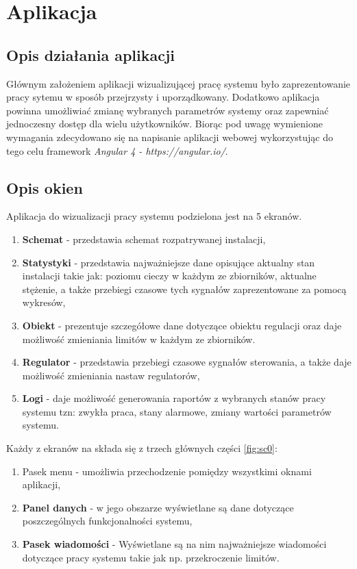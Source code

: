 \chapter{Aplikacja}
\section{Opis działania aplikacji}
Głównym założeniem aplikacji wizualizującej pracę systemu było zaprezentowanie pracy sytemu w sposób przejrzysty i uporządkowany. Dodatkowo aplikacja powinna umożliwiać zmianę wybranych parametrów systemy oraz zapewniać jednoczesny dostęp dla wielu użytkowników. Biorąc pod uwagę wymienione wymagania zdecydowano się na napisanie aplikacji webowej wykorzystując do tego celu framework \textit{Angular 4 - https://angular.io/}.
\section{Opis okien}
Aplikacja do wizualizacji pracy systemu podzielona jest na 5 ekranów. 
\begin{enumerate}
	\item \textbf{Schemat} - przedstawia schemat rozpatrywanej instalacji,
	\item \textbf{Statystyki} - przedstawia najważniejsze dane opisujące aktualny stan instalacji takie jak: poziomu cieczy w każdym ze zbiorników, aktualne stężenie, a także przebiegi czasowe tych sygnałów zaprezentowane za pomocą wykresów,
	\item \textbf{Obiekt} - prezentuje szczegółowe dane dotyczące obiektu regulacji oraz daje możliwość zmieniania limitów w każdym ze zbiorników.
	\item \textbf{Regulator} - przedstawia przebiegi czasowe sygnałów sterowania, a także daje możliwość zmieniania nastaw regulatorów,
	\item \textbf{Logi} - daje możliwość generowania raportów z wybranych stanów pracy systemu tzn: zwykła praca, stany alarmowe, zmiany wartości parametrów systemu.
\end{enumerate}
Każdy z ekranów na składa się z trzech głównych części \ref{fig:sc0}:
\begin{enumerate}
	\item Pasek menu - umożliwia przechodzenie pomiędzy wszystkimi oknami aplikacji,
	\item \textbf{Panel danych} - w jego obszarze wyświetlane są dane dotyczące poszczególnych funkcjonalności systemu,
	\item \textbf{Pasek wiadomości} - Wyświetlane są na nim najważniejsze wiadomości dotyczące pracy systemu takie jak np. przekroczenie limitów.
\end{enumerate}


